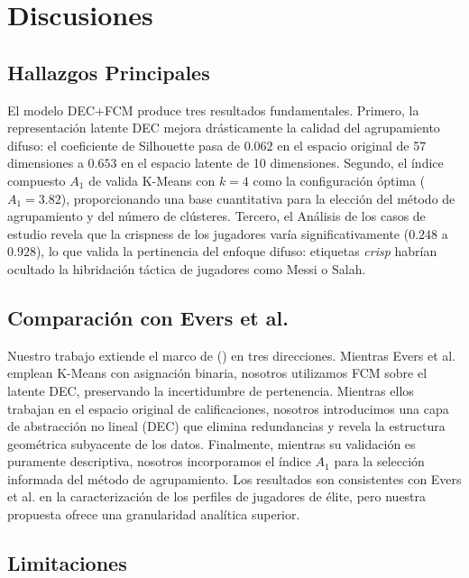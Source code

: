 \documentclass[conference]{IEEEtran}
\begin{document}
\section{Discusiones}

\subsection{Hallazgos Principales}

El modelo DEC+FCM produce tres resultados fundamentales. Primero, la representación latente DEC mejora drásticamente la calidad del agrupamiento difuso: el coeficiente de Silhouette pasa de $0.062$ en el espacio original de 57 dimensiones a $0.653$ en el espacio latente de 10 dimensiones. Segundo, el índice compuesto $A_1$ de \citeauthor{akhanli2022clustering} valida K-Means con $k=4$ como la configuración óptima ($A_1 = 3.82$), proporcionando una base cuantitativa para la elección del método de agrupamiento y del número de clústeres. Tercero, el Análisis de los casos de estudio revela que la crispness de los jugadores varía significativamente ($0.248$ a $0.928$), lo que valida la pertinencia del enfoque difuso: etiquetas \textit{crisp} habrían ocultado la hibridación táctica de jugadores como Messi o Salah.

\subsection{Comparación con Evers et al.}

Nuestro trabajo extiende el marco de \citeauthor{evers2024visual} (\citeyear{evers2024visual}) en tres direcciones. Mientras Evers et al. emplean K-Means con asignación binaria, nosotros utilizamos FCM sobre el latente DEC, preservando la incertidumbre de pertenencia. Mientras ellos trabajan en el espacio original de calificaciones, nosotros introducimos una capa de abstracción no lineal (DEC) que elimina redundancias y revela la estructura geométrica subyacente de los datos. Finalmente, mientras su validación es puramente descriptiva, nosotros incorporamos el índice $A_1$ para la selección informada del método de agrupamiento. Los resultados son consistentes con Evers et al. en la caracterización de los perfiles de jugadores de élite, pero nuestra propuesta ofrece una granularidad analítica superior.

\subsection{Limitaciones}
\end{document}
